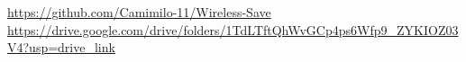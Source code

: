 \newcommand{\OverleafLink}{\textit{Pending overleaf URL}}
\urldef{\GitHubLink}\url{https://github.com/Camimilo-11/Wireless-Save}
\urldef{\VideoLink}\url{https://drive.google.com/drive/folders/1TdLTftQhWvGCp4ps6Wfp9_ZYKIOZ03V4?usp=drive_link}
